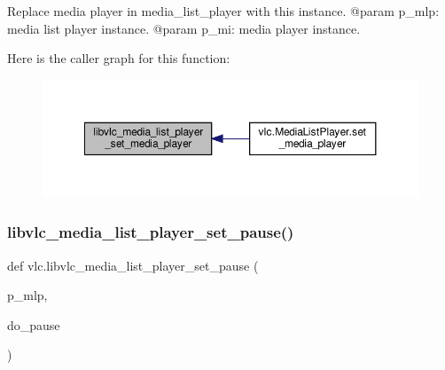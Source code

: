 \begin{DoxyVerb}Replace media player in media_list_player with this instance.
@param p_mlp: media list player instance.
@param p_mi: media player instance.
\end{DoxyVerb}
 Here is the caller graph for this function\+:
\nopagebreak
\begin{figure}[H]
\begin{center}
\leavevmode
\includegraphics[width=350pt]{namespacevlc_ae77d2d55e63161551bc26b440c28743c_icgraph}
\end{center}
\end{figure}
\mbox{\label{namespacevlc_ab9597e2c2fd5fb8a8ea9f1c259796605}} 
\subsubsection{\texorpdfstring{libvlc\+\_\+media\+\_\+list\+\_\+player\+\_\+set\+\_\+pause()}{libvlc\_media\_list\_player\_set\_pause()}}
{\footnotesize\ttfamily def vlc.\+libvlc\+\_\+media\+\_\+list\+\_\+player\+\_\+set\+\_\+pause (\begin{DoxyParamCaption}\item[{}]{p\+\_\+mlp,  }\item[{}]{do\+\_\+pause }\end{DoxyParamCaption})}

